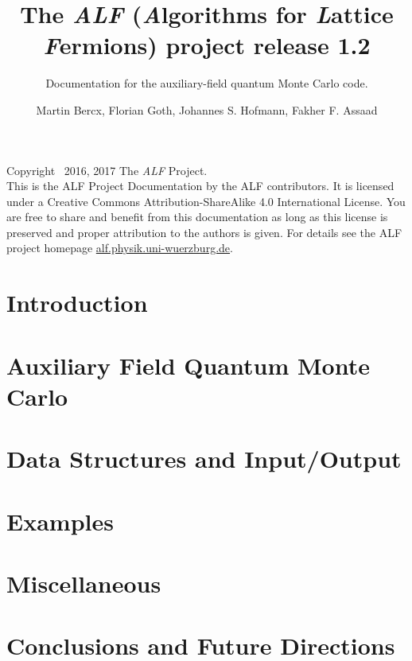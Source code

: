 \documentclass[10pt,Arial]{scrartcl}
\begin{document}
\title{The \emph{ALF} (\emph{A}lgorithms for \emph{L}attice \emph{F}ermions) project release 1.2}

\subtitle{Documentation for the  auxiliary-field quantum Monte Carlo code.}
\author{Martin Bercx,  Florian Goth,  Johannes S. Hofmann, Fakher F. Assaad }
\maketitle

Copyright \textcopyright ~2016, 2017 The \textit{ALF} Project.\\
This is the ALF Project Documentation by the ALF contributors.
It is licensed under a Creative Commons Attribution-ShareAlike 4.0 International License.
You are free to share and benefit from this documentation as long as this license is preserved
and proper attribution to the authors is given. For details see the ALF project
homepage \url{alf.physik.uni-wuerzburg.de}.
\tableofcontents
\clearpage
\section{Introduction}\label{sec:intro}

\section{Auxiliary Field Quantum Monte Carlo}\label{sec:def}





\section{Data Structures and Input/Output}\label{sec:imp}





\section{Examples}\label{sec:ex}

\section{Miscellaneous}\label{sec:misc}







\section{Conclusions and Future Directions}\label{sec:con}


 


\end{document}
